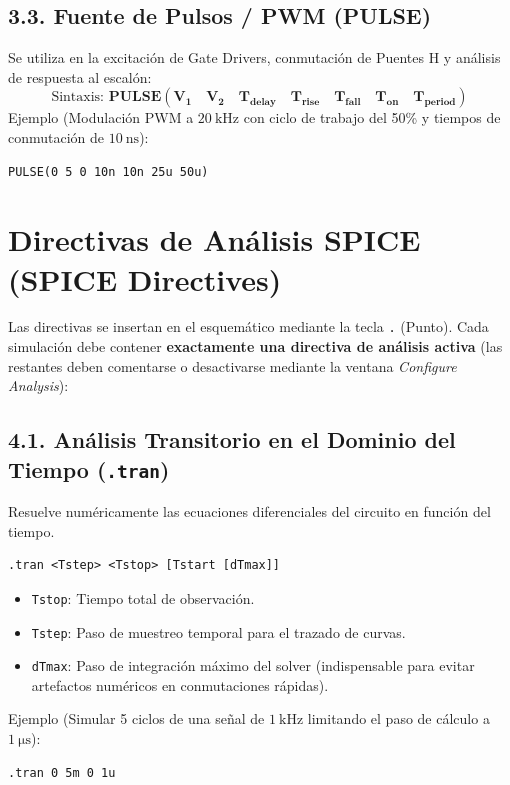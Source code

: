 \documentclass[11pt, a4paper]{article}
\begin{document}
\subsection{3.3. Fuente de Pulsos / PWM (PULSE)}
Se utiliza en la excitación de Gate Drivers, conmutación de Puentes H y análisis de respuesta al escalón:
\begin{equation*}
    \text{Sintaxis: } \mathbf{PULSE(V_1 \quad V_2 \quad T_{delay} \quad T_{rise} \quad T_{fall} \quad T_{on} \quad T_{period})}
\end{equation*}
Ejemplo (Modulación PWM a $\qty{20}{\kilo\hertz}$ con ciclo de trabajo del 50\% y tiempos de conmutación de $\qty{10}{\nano\second}$):
\begin{lstlisting}[style=spicestyle]
PULSE(0 5 0 10n 10n 25u 50u)
\end{lstlisting}

\section{Directivas de Análisis SPICE (SPICE Directives)}
Las directivas se insertan en el esquemático mediante la tecla \texttt{.} (Punto). Cada simulación debe contener \textbf{exactamente una directiva de análisis activa} (las restantes deben comentarse o desactivarse mediante la ventana \textit{Configure Analysis}):

\subsection{4.1. Análisis Transitorio en el Dominio del Tiempo (\texttt{.tran})}
Resuelve numéricamente las ecuaciones diferenciales del circuito en función del tiempo.
\begin{lstlisting}[style=spicestyle]
.tran <Tstep> <Tstop> [Tstart [dTmax]]
\end{lstlisting}
\begin{itemize}
    \item \texttt{Tstop}: Tiempo total de observación.
    \item \texttt{Tstep}: Paso de muestreo temporal para el trazado de curvas.
    \item \texttt{dTmax}: Paso de integración máximo del solver (indispensable para evitar artefactos numéricos en conmutaciones rápidas).
\end{itemize}
Ejemplo (Simular 5 ciclos de una señal de $\qty{1}{\kilo\hertz}$ limitando el paso de cálculo a $\qty{1}{\micro\second}$):
\begin{lstlisting}[style=spicestyle]
.tran 0 5m 0 1u
\end{lstlisting}
\end{document}
